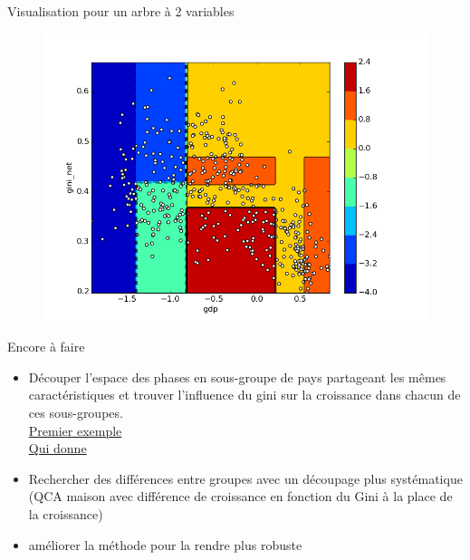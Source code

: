 \documentclass[xcolor=x11names,french]{beamer}
\renewcommand{\(}{\begin{columns}}
\renewcommand{\)}{\end{columns}}
\newcommand{\<}[1]{\begin{column}{#1}}
\renewcommand{\>}{\end{column}}
\begin{document}
\begin{frame}{Visualisation pour un arbre à 2 variables}

\begin{figure}
\includegraphics[scale=0.52]{decision_tree_vizualisation}
\end{figure}

\end{frame}


\begin{frame}{Encore à faire}

\begin{itemize}
\item Découper l'espace des phases en sous-groupe de pays partageant les mêmes caractéristiques et trouver l'influence du gini sur la croissance dans chacun de ces sous-groupes. \\
\bigskip
\href{./exemple_sous_groupe_pvalue.pdf}{Premier exemple} \\
\bigskip
\href{./gini-growth_correlations.pdf}{Qui donne}
\item Rechercher des différences entre groupes avec un découpage plus systématique (QCA maison avec différence de croissance en fonction du Gini à la place de la croissance)
\item améliorer la méthode pour la rendre plus robuste 
\end{itemize}


\end{frame}
\end{document}

